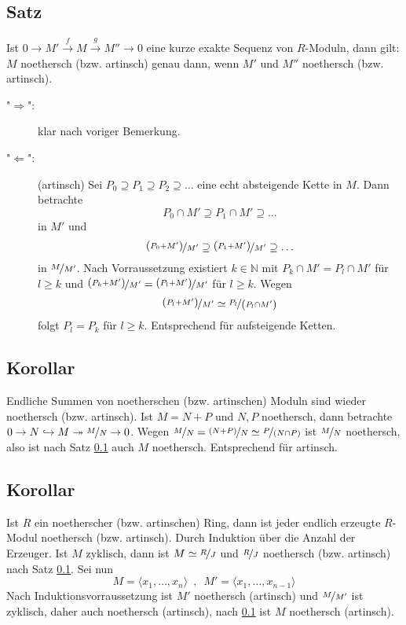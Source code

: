 \subsection[Satz: noethersch (artinsch) innerhalb einer kurzen exakten Sequenz]{Satz} %
\label{sub:213}
Ist $0 \to M' \xrightarrow{f} M \xrightarrow{g} M'' \to 0  $ eine kurze exakte Sequenz von $R$-Moduln, dann gilt: $M$ noethersch (bzw. artinsch) genau dann, wenn
$M'$ und $M''$ noethersch (bzw. artinsch).
\begin{description}
	\item["$\Rightarrow $":] klar nach voriger Bemerkung.
	\item["$\Leftarrow$":] (artinsch) Sei $P_0 \supseteq P_1 \supseteq P_2 \supseteq \ldots $ eine echt absteigende Kette in $M$. Dann betrachte 
	\[
		P_0 \cap M' \supseteq P_1 \cap M' \supseteq \ldots 
	\]
	in $M'$ und 
	\[
		\nicefrac{\enbrace*{P_0 +  M'} }{M'} \supseteq \nicefrac{\enbrace*{P_1 + M'} }{M'} \supseteq \ldots 
	\]
	in $\nicefrac{M}{M'}$. Nach Vorraussetzung existiert $k \in \mathds{N}$ mit $P_k \cap M' = P_l \cap M'$ für $l \ge k$ und 
	$\nicefrac{\enbrace*{P_k +M'} }{M'} = \nicefrac{\enbrace*{P_l + M'} }{M'}$ für $l \ge k$. Wegen
	\[
		\nicefrac{\enbrace*{P_l + M'} }{M'} \simeq \nicefrac{P_l}{\enbrace*{P_l \cap M'} }
	\]
	folgt $P_l = P_k$ für $l \ge k$. Entsprechend für aufsteigende Ketten. \bewende
\end{description}

\subsection[Korollar: Endliche Summen noetherscher Moduln sind noethersch (artinsch)]{Korollar} %
\label{sub:214}
Endliche Summen von noetherschen (bzw. artinschen) Moduln sind wieder noethersch (bzw. artinsch).
Ist $M = N + P$ und $N,P$ noethersch, dann betrachte $0 \to N \hookrightarrow M \twoheadrightarrow \nicefrac{M}{N} \to 0$. Wegen 
$\nicefrac{M}{N} = \nicefrac{(N+P)}{N} \simeq \nicefrac{P}{(N \cap P)}$ ist $\nicefrac{M}{N}$ noethersch, also ist nach Satz \ref{sub:213} auch $M$ noethersch. 
Entsprechend für artinsch. \bewende

\subsection[Korollar: Moduln über einen noetherschen Ring sind noethersch]{Korollar} %
\label{sub:215}
Ist $R$ ein noetherscher (bzw. artinschen) Ring, dann ist jeder endlich erzeugte $R$-Modul noethersch (bzw. artinsch).
Durch Induktion über die Anzahl der Erzeuger. Ist $M$ zyklisch, dann ist $M \simeq \nicefrac{R}{J}$
und $\nicefrac{R}{J}$ noethersch (bzw. artinsch) nach Satz \ref{sub:213}. Sei nun 
\[
	M = \langle x_1, \ldots , x_n \rangle \enspace, \enspace M' =  \langle x_1, \ldots , x_{n-1}\rangle
\]
Nach Induktionsvorraussetzung ist $M'$ noethersch (artinsch) und $\nicefrac{M}{M'}$ ist zyklisch, daher auch noethersch (artinsch), nach \ref{sub:213} ist $M$ noethersch 
(artinsch). \bewende


